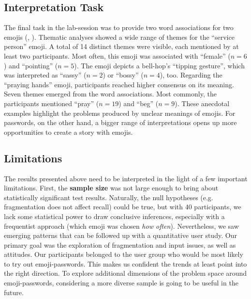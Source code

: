 \subsection{Interpretation Task}
The final task in the lab-session was to provide two word associations for two emojis (, ). Thematic analyses showed a wide range of themes for the ``service person'' emoji. A total of 14 distinct themes were visible, each mentioned by at least two participants. Most often, this emoji was associated with ``female'' ($n=6$) and ``pointing'' ($n=5$). The emoji depicts a bell-hop's ``tipping gesture'', which was interpreted as ``sassy'' ($n=2$) or ``bossy'' ($n=4$), too. Regarding the ``praying hands'' emoji, participants reached higher consensus on its meaning. Seven themes emerged from the word associations. Most commonly, the participants mentioned ``pray'' ($n=19$) and ``beg'' ($n=9$). These anecdotal examples highlight the problems produced by unclear meanings of emojis. For passwords, on the other hand, a bigger range of interpretations opens up more opportunities to create a story with emojis.

\subsection{Limitations}
The results presented above need to be interpreted in the light of a few important limitations. First, the \textbf{sample size} was not large enough to bring about statistically significant test results. Naturally, the null hypotheses (e.g. fragmentation does not affect recall) could be true, but with 40 participants, we lack some statistical power to draw conclusive inferences, especially with a frequentist approach (which emoji was chosen \textit{how often}). Nevertheless, we saw emerging patterns that can be followed up with a quantitative user study. Our primary goal was the exploration of fragmentation and input issues, as well as attitudes. Our participants belonged to the user group who would be most likely to try out emoji-passwords. This makes us confident the trends at least point into the right direction. To explore additional dimensions of the problem space around emoji-passwords, considering a more diverse sample is going to be useful in the future.

